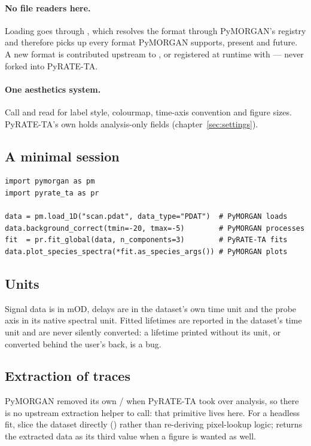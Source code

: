 \paragraph{No file readers here.}
Loading goes through , which resolves
the format through PyMORGAN's registry and therefore picks up every format
PyMORGAN supports, present and future. A new format is contributed upstream to
, or registered at runtime with
 --- never forked into PyRATE-TA.

\paragraph{One aesthetics system.}
Call  and read  for label
style, colourmap, time-axis convention and figure sizes. PyRATE-TA's own
 holds analysis-only fields (chapter~\ref{sec:settings}).

\subsection{A minimal session}

\begin{lstlisting}
import pymorgan as pm
import pyrate_ta as pr

data = pm.load_1D("scan.pdat", data_type="PDAT")  # PyMORGAN loads
data.background_correct(tmin=-20, tmax=-5)        # PyMORGAN processes
fit  = pr.fit_global(data, n_components=3)        # PyRATE-TA fits
data.plot_species_spectra(*fit.as_species_args()) # PyMORGAN plots
\end{lstlisting}

\subsection{Units}\label{sec:units}

Signal data is in mOD, delays are in the dataset's own time unit and the probe
axis in its native spectral unit. Fitted lifetimes are reported in the
dataset's time unit and are never silently converted: a lifetime printed
without its unit, or converted behind the user's back, is a bug.

\subsection{Extraction of traces}

PyMORGAN removed its own / when
PyRATE-TA took over analysis, so there is no upstream extraction helper to call:
that primitive lives here. For a headless fit, slice the dataset directly
() rather than re-deriving pixel-lookup logic;
 returns the extracted data as its third value
when a figure is wanted as well.
